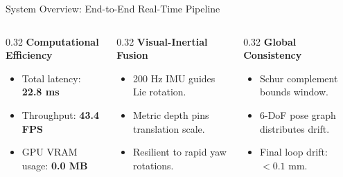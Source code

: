 \documentclass[aspectratio=169, 10pt]{beamer}
\begin{document}
\begin{frame}{System Overview: End-to-End Real-Time Pipeline}
  \vspace{0.35cm}
  \begin{columns}[T]
    \begin{column}{0.32\textwidth}
      {\small \textbf{\textcolor{NavyBlue}{Computational Efficiency}}}
      \begin{itemize}
        \setlength{\itemsep}{2pt}
        \item Total latency: \textbf{22.8 ms}
        \item Throughput: \textbf{43.4 FPS}
        \item GPU VRAM usage: \textbf{0.0 MB}
      \end{itemize}
    \end{column}

    \begin{column}{0.32\textwidth}
      {\small \textbf{\textcolor{NavyBlue}{Visual-Inertial Fusion}}}
      \begin{itemize}
        \setlength{\itemsep}{2pt}
        \item 200 Hz IMU guides Lie rotation.
        \item Metric depth pins translation scale.
        \item Resilient to rapid yaw rotations.
      \end{itemize}
    \end{column}

    \begin{column}{0.32\textwidth}
      {\small \textbf{\textcolor{NavyBlue}{Global Consistency}}}
      \begin{itemize}
        \setlength{\itemsep}{2pt}
        \item Schur complement bounds window.
        \item 6-DoF pose graph distributes drift.
        \item Final loop drift: \textbf{$<0.1\text{ mm}$}.
      \end{itemize}
    \end{column}
  \end{columns}
\end{frame}
\end{document}
